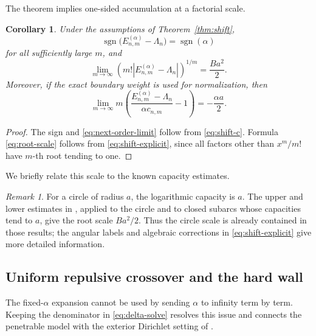 \documentclass[12pt,a4paper]{article}
\numberwithin{equation}{section}
\newtheorem{cor}[thm]{Corollary}
\theoremstyle{remark}
\newtheorem{rem}[thm]{Remark}
\theoremstyle{definition}
\begin{document}
The theorem implies one-sided accumulation at a factorial scale.

\begin{cor}\label{cor:factorial}
Under the assumptions of Theorem~\ref{thm:shift},
$$
\operatorname{sgn}\bigl(E_{n,m}^{(\alpha)}-\Lambda_n\bigr)
=\operatorname{sgn}(\alpha)
$$
for all sufficiently large $m$, and
\begin{equation}\label{eq:root-scale}
\lim_{m\to\infty}
\left(m!\left|E_{n,m}^{(\alpha)}-\Lambda_n\right|\right)^{1/m}
=\frac{Ba^2}{2}.
\end{equation}
Moreover, if the exact boundary weight is used for normalization, then
\begin{equation}\label{eq:next-order-limit}
\lim_{m\to\infty}
m\left(
\frac{E_{n,m}^{(\alpha)}-\Lambda_n}{\alpha c_{n,m}}-1
\right)
=-\frac{\alpha a}{2}.
\end{equation}
\end{cor}

\begin{proof}
The sign and \eqref{eq:next-order-limit} follow from \eqref{eq:shift-c}.
Formula \eqref{eq:root-scale} follows from \eqref{eq:shift-explicit}, since all
factors other than $x^m/m!$ have $m$-th root tending to one.
\end{proof}

We briefly relate this scale to the known capacity estimates.

\begin{rem}\label{rem:capacity}
For a circle of radius $a$, the logarithmic capacity is $a$. The upper
and lower estimates in \cite[Theorem~6.4 and Proposition~6.6]{BEHL2020},
applied to the circle and to
closed subarcs whose capacities tend to $a$, give the root scale $Ba^2/2$. Thus the circle scale is
already contained in those results; the angular labels and algebraic
corrections in \eqref{eq:shift-explicit} give more detailed information.
\end{rem}

\subsection{Uniform repulsive crossover and the hard wall}
\label{sec:crossover}

The fixed-$\alpha$ expansion cannot be used by sending $\alpha$ to
infinity term by term. Keeping the denominator in \eqref{eq:delta-solve}
resolves this issue and connects the penetrable model with the exterior
Dirichlet setting of \cite{PushnitskiRozenblum2007}.
\end{document}
